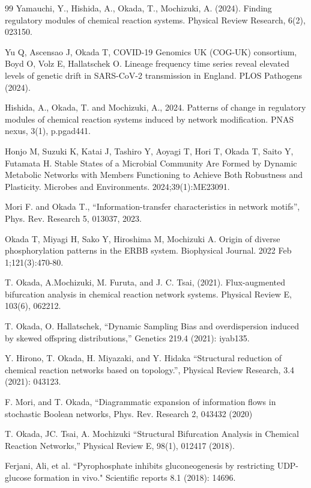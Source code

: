 \documentclass[letterpaper,12pt]{article}
\begin{document}
\begin{thebibliography}{99}
\bibitem{}Yamauchi, Y., Hishida, A., Okada, T., Mochizuki, A. (2024). Finding regulatory modules of chemical reaction systems. Physical Review Research, 6(2), 023150.

\bibitem{}Yu Q, Ascensao J, Okada T, COVID-19 Genomics UK (COG-UK) consortium, Boyd O, Volz E, Hallatschek O. Lineage frequency time series reveal elevated levels of genetic drift in SARS-CoV-2 transmission in England. PLOS Pathogens (2024).

\bibitem{}Hishida, A., Okada, T. and Mochizuki, A., 2024. Patterns of change in regulatory modules of chemical reaction systems induced by network modification. PNAS nexus, 3(1), p.pgad441.

\bibitem{}Honjo M, Suzuki K, Katai J, Tashiro Y, Aoyagi T, Hori T, Okada T, Saito Y, Futamata H. Stable States of a Microbial Community Are Formed by Dynamic Metabolic Networks with Members Functioning to Achieve Both Robustness and Plasticity. Microbes and Environments. 2024;39(1):ME23091.

\bibitem{} Mori F. and Okada T., ``Information-transfer characteristics in network motifs'', Phys. Rev. Research 5, 013037, 2023.

\bibitem{}Okada T, Miyagi H, Sako Y, Hiroshima M, Mochizuki A. Origin of diverse phosphorylation patterns in the ERBB system. Biophysical Journal. 2022 Feb 1;121(3):470-80.

\bibitem{}T. Okada, A.Mochizuki, M. Furuta, and J. C. Tsai, (2021). Flux-augmented bifurcation analysis in chemical reaction network systems. Physical Review E, 103(6), 062212.

\bibitem{}T. Okada, O. Hallatschek, ``Dynamic Sampling Bias and overdispersion induced by skewed offspring distributions,'' Genetics  219.4 (2021): iyab135.

\bibitem{}Y. Hirono, T. Okada, H. Miyazaki, and Y. Hidaka ``Structural reduction of chemical reaction networks based on topology.'', Physical Review Research, 3.4 (2021): 043123.

\bibitem{}F. Mori, and T. Okada, ``Diagrammatic expansion of information flows in stochastic Boolean networks, Phys. Rev. Research 2, 043432 (2020)

\bibitem{} T. Okada, JC. Tsai, A. Mochizuki  ``Structural Bifurcation Analysis in Chemical Reaction Networks,'' Physical Review E, 98(1), 012417 (2018).

\bibitem{}Ferjani, Ali, et al. ``Pyrophosphate inhibits gluconeogenesis by restricting UDP-glucose formation in vivo." Scientific reports 8.1 (2018): 14696.


\end{thebibliography}
\end{document}
